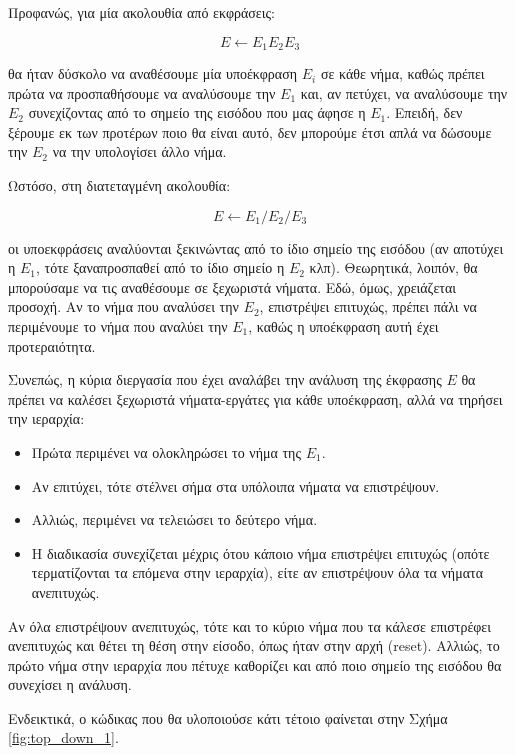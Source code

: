 Προφανώς, για μία ακολουθία από εκφράσεις:

\begin{equation}
	E \leftarrow E_1 E_2 E_3
\end{equation}

θα ήταν δύσκολο να αναθέσουμε μία υποέκφραση $E_i$ σε κάθε νήμα, καθώς πρέπει πρώτα να προσπαθήσουμε να αναλύσουμε την $E_1$ και, αν πετύχει, να αναλύσουμε την $E_2$ συνεχίζοντας από το σημείο της εισόδου που μας άφησε η $E_1$. 
Επειδή, δεν ξέρουμε εκ των προτέρων ποιο θα είναι αυτό, δεν μπορούμε έτσι απλά να δώσουμε την $E_2$ να την υπολογίσει άλλο νήμα.

Ωστόσο, στη διατεταγμένη ακολουθία:

\begin{equation}
	E \leftarrow E_1 / E_2 /  E_3
\end{equation}

οι υποεκφράσεις αναλύονται ξεκινώντας από το ίδιο σημείο της εισόδου (αν αποτύχει η $E_1$, τότε ξαναπροσπαθεί από το ίδιο σημείο η $E_2$ κλπ).
Θεωρητικά, λοιπόν, θα μπορούσαμε να τις αναθέσουμε σε ξεχωριστά νήματα.
Εδώ, όμως, χρειάζεται προσοχή.
Αν το νήμα που αναλύσει την $E_2$, επιστρέψει επιτυχώς, πρέπει πάλι να περιμένουμε το νήμα που αναλύει την $E_1$, καθώς η υποέκφραση αυτή έχει προτεραιότητα.

Συνεπώς, η κύρια διεργασία που έχει αναλάβει την ανάλυση της έκφρασης $E$ θα πρέπει να καλέσει ξεχωριστά νήματα-εργάτες για κάθε υποέκφραση, αλλά να τηρήσει την ιεραρχία:

\begin{itemize}
	\item Πρώτα περιμένει να ολοκληρώσει το νήμα της $E_1$.
	\item Αν επιτύχει, τότε στέλνει σήμα στα υπόλοιπα νήματα να επιστρέψουν.
	\item Αλλιώς, περιμένει να τελειώσει το δεύτερο νήμα.
	\item Η διαδικασία συνεχίζεται μέχρις ότου κάποιο νήμα επιστρέψει επιτυχώς (οπότε τερματίζονται τα 
	  επόμενα στην ιεραρχία), είτε αν επιστρέψουν όλα τα νήματα ανεπιτυχώς. %
\end{itemize}

Αν όλα επιστρέψουν ανεπιτυχώς, τότε και το κύριο νήμα που τα κάλεσε επιστρέφει ανεπιτυχώς και θέτει τη θέση στην είσοδο, όπως ήταν στην αρχή (reset).
Αλλιώς, το πρώτο νήμα στην ιεραρχία που πέτυχε καθορίζει και από ποιο σημείο της εισόδου θα συνεχίσει η ανάλυση.

Ενδεικτικά, ο κώδικας που θα υλοποιούσε κάτι τέτοιο φαίνεται στην Σχήμα \ref{fig:top_down_1}.

